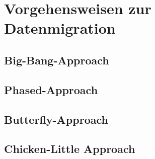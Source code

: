 \section{Vorgehensweisen zur Datenmigration}

\subsection{Big-Bang-Approach}


\subsection{Phased-Approach}


\subsection{Butterfly-Approach}


\subsection{Chicken-Little Approach}
